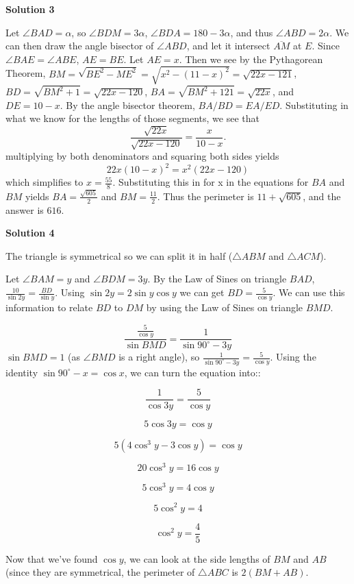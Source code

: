 \begin{enumerate}
 



\textbf{Solution 3}

Let $\angle BAD=\alpha$, so $\angle BDM=3\alpha$, $\angle BDA=180-3\alpha$, and thus $\angle ABD=2\alpha.$ We can then draw the angle bisector of $\angle ABD$, and let it intersect $\overline{AM}$ at $E.$ Since $\angle BAE=\angle ABE$, $AE=BE.$ Let $AE=x$. Then we see by the Pythagorean Theorem, $BM=\sqrt{BE^2-ME^2}=\sqrt{x^2-(11-x)^2}=\sqrt{22x-121}$, $BD=\sqrt{BM^2+1}=\sqrt{22x-120}$, $BA=\sqrt{BM^2+121}=\sqrt{22x}$, and $DE=10-x.$ By the angle bisector theorem, $BA/BD=EA/ED.$ Substituting in what we know for the lengths of those segments, we see that 
 \[\frac{\sqrt{22x}}{\sqrt{22x-120}}=\frac{x}{10-x}.\] multiplying by both denominators and squaring both sides yields 
 \[22x(10-x)^2=x^2(22x-120)\] which simplifies to $x=\frac{55}{8}.$ Substituting this in for x in the equations for $BA$ and $BM$ yields $BA=\frac{\sqrt{605}}{2}$ and $BM=\frac{11}{2}.$ Thus the perimeter is $11+\sqrt{605}$, and the answer is $\boxed{616}$.

 



\textbf{Solution 4}

The triangle is symmetrical so we can split it in half ($\triangle ABM$ and $\triangle ACM$). 

 Let $\angle BAM = y$ and $\angle BDM = 3y$. By the Law of Sines on triangle $BAD$, $\frac{10}{\sin 2y} = \frac{BD}{\sin y}$. Using $\sin 2y = 2\sin y\cos y$ we can get $BD = \frac{5}{\cos y}$. We can use this information to relate $BD$ to $DM$ by using the Law of Sines on triangle $BMD$.

 
 \[\frac{\frac{5}{\cos y}}{\sin BMD} = \frac{1}{\sin 90^\circ - 3y}\]
$\sin BMD = 1$ (as $\angle BMD$ is a right angle), so $\frac{1}{\sin 90^\circ - 3y} = \frac{5}{\cos y}$. Using the identity $\sin 90^\circ - x = \cos x$, we can turn the equation into::

 
 \[\frac{1}{\cos 3y} = \frac{5}{\cos y}\]

 \[5\cos 3y = \cos y\]

 \[5(4\cos ^3 y - 3\cos y) = \cos y\]

 \[20\cos ^3 y = 16 \cos y\]

 \[5\cos ^3 y = 4\cos y\]

 \[5\cos ^2 y = 4\]

 \[\cos ^2 y = \frac{4}{5}\]

 Now that we've found $\cos y$, we can look at the side lengths of $BM$ and $AB$ (since they are symmetrical, the perimeter of $\triangle ABC$ is $2(BM + AB)$.


\end{enumerate}
